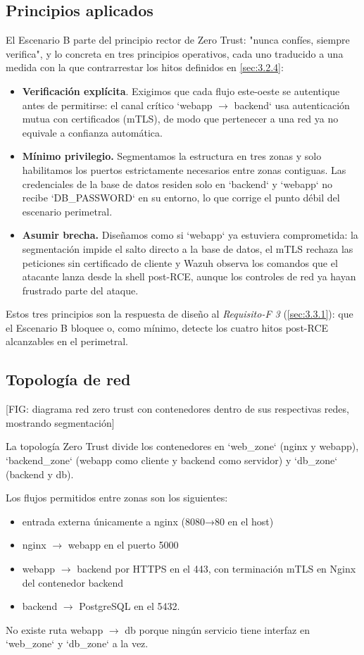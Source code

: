         \subsection{Principios aplicados}
        \label{sec:4.3.1}
        El Escenario B parte del principio rector de Zero Trust: "nunca confíes, siempre verifica", y lo concreta en tres principios operativos, cada uno traducido a una medida con la que contrarrestar los hitos definidos en \cref{sec:3.2.4}:
        \begin{itemize}
            \item \textbf{Verificación explícita}. Exigimos que cada flujo este-oeste se autentique antes de permitirse: el canal crítico `webapp $\rightarrow$ backend` usa autenticación mutua con certificados (mTLS), de modo que pertenecer a una red ya no equivale a confianza automática.
            \item \textbf{Mínimo privilegio.} Segmentamos la estructura en tres zonas y solo habilitamos los puertos estrictamente necesarios entre zonas contiguas. Las credenciales de la base de datos residen solo en `backend` y `webapp` no recibe `DB\_PASSWORD` en su entorno, lo que corrige el punto débil del escenario perimetral.
            \item \textbf{Asumir brecha.} Diseñamos como si `webapp` ya estuviera comprometida: la segmentación impide el salto directo a la base de datos, el mTLS rechaza las peticiones sin certificado de cliente y Wazuh observa los comandos que el atacante lanza desde la shell post-RCE, aunque los controles de red ya hayan frustrado parte del ataque.
        \end{itemize}
        Estos tres principios son la respuesta de diseño al \textit{Requisito-F 3} (\cref{sec:3.3.1}): que el Escenario B bloquee o, como mínimo, detecte los cuatro hitos post-RCE alcanzables en el perimetral.
        
        \subsection{Topología de red}
        [FIG: diagrama red zero trust con contenedores dentro de sus respectivas redes, mostrando segmentación]
        
        La topología Zero Trust divide los contenedores en `web\_zone` (nginx y webapp), `backend\_zone` (webapp como cliente y backend como servidor) y `db\_zone` (backend y db). 
        
        Los flujos permitidos entre zonas son los siguientes:
        \begin{itemize}
            \item entrada externa únicamente a nginx (8080→80 en el host)
            \item nginx $\rightarrow$ webapp en el puerto 5000
            \item webapp $\rightarrow$ backend por HTTPS en el 443, con terminación mTLS en Nginx del contenedor backend
            \item backend $\rightarrow$ PostgreSQL en el 5432. 
        \end{itemize}
        No existe ruta webapp $\rightarrow$ db porque ningún servicio tiene interfaz en `web\_zone` y `db\_zone` a la vez.
        

